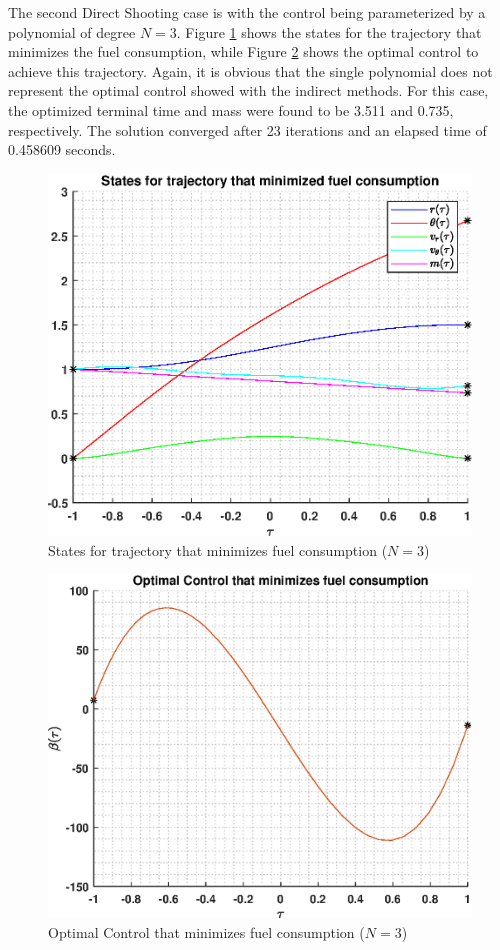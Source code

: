 \documentclass[]{article}
\begin{document}
The second Direct Shooting case is with the control being parameterized by a polynomial of degree \(N = 3\). Figure \ref{fig:directStatesPoly3} shows the states for the trajectory that minimizes the fuel consumption, while Figure \ref{fig:directControlPoly3} shows the optimal control to achieve this trajectory. Again, it is obvious that the single polynomial does not represent the optimal control showed with the indirect methods. For this case, the optimized terminal time and mass were found to be 3.511 and 0.735, respectively. The solution converged after 23 iterations and an elapsed time of 0.458609 seconds.
\begin{figure}
	\centering
	\includegraphics[scale=0.75]{directStatesPoly3.eps}
	\caption{States for trajectory that minimizes fuel consumption (\(N = 3\))}
	\label{fig:directStatesPoly3}
\end{figure}
\begin{figure}
	\centering
	\includegraphics[scale=0.75]{directControlPoly3.eps}
	\caption{Optimal Control that minimizes fuel consumption (\(N = 3\))}
	\label{fig:directControlPoly3}
\end{figure}
\FloatBarrier
\end{document}
